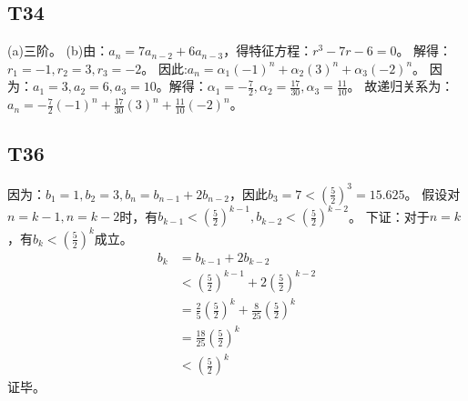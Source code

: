 \documentclass{article}
\begin{document}
\subsection{T34}
(a)三阶。
(b)由：$a_n = 7a_{n - 2} + 6a_{n - 3}$，得特征方程：$r^3 - 7r - 6 = 0$。
解得：$r_1 = -1, r_2 = 3, r_3 = -2$。
因此:$a_n = \alpha_1 (-1)^n + \alpha_2 (3)^n + \alpha_3 (-2)^n$。
因为：$a_1 = 3, a_2 = 6, a_3 = 10$。解得：$\alpha_1 = -\frac{7}{2}, \alpha_2 = \frac{17}{30}
, \alpha_3 = \frac{11}{10}$。
故递归关系为：$a_n = -\frac{7}{2}(-1)^n + \frac{17}{30}(3)^n + \frac{11}{10}(-2)^n$。
\subsection{T36}
因为：$b_1 = 1, b_2 = 3, b_n = b_{n - 1} + 2b_{n - 2}$，因此$b_3 = 7 < (\frac{5}{2})^3 = 15.625$。
假设对$n = k - 1, n = k - 2$时，有$b_{k - 1} < (\frac{5}{2})^{k - 1}, b_{k - 2} < (\frac{5}{2})^{k - 2}$。
下证：对于$n = k$，有$b_k < (\frac{5}{2})^k$成立。
\begin{align*}
    b_k &= b_{k - 1} + 2 b_{k - 2}\\
    &< (\frac{5}{2})^{k - 1} + 2 (\frac{5}{2})^{k - 2}\\
    &= \frac{2}{5}(\frac{5}{2})^k + \frac{8}{25}(\frac{5}{2})^k\\
    &= \frac{18}{25}(\frac{5}{2})^k\\
    &< (\frac{5}{2})^k
\end{align*}
证毕。
\end{document}
